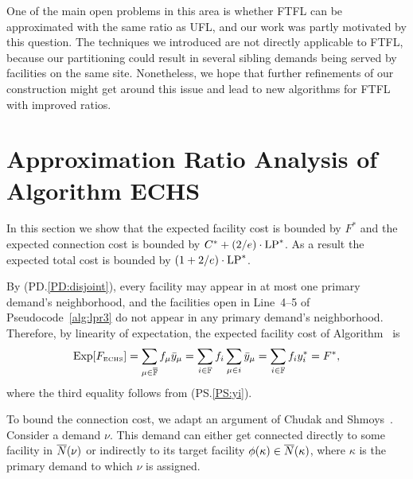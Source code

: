 \documentclass{llncs}
\begin{document}
One of the main open problems in this area is whether FTFL can be approximated with the
same ratio as UFL, and our work was partly motivated by this question. The techniques we
introduced are not directly applicable to FTFL, because our partitioning
could result in several sibling demands being served
by facilities on the same site. Nonetheless, we hope that further refinements of 
our construction might get around this issue and
lead to new algorithms for FTFL with improved ratios.

\vfill
\eject



\pagebreak


\appendix
\section{Approximation Ratio Analysis of Algorithm ECHS}
\label{app: 1.736 analysis}
In this section we show that the expected facility cost is bounded by
$F^\ast$ and the expected connection cost is bounded by $C^\ast +
(2/e) \cdot \mbox{\rm LP}^\ast$. As a result the expected total cost is bounded
by $(1 + 2/e)\cdot \mbox{\rm LP}^\ast$.

By (PD.\ref{PD:disjoint}), every facility may appear in at most one
primary demand's neighborhood, and the facilities open in Line~4--5 of
Pseudocode~\ref{alg:lpr3} do not appear in any primary demand's
neighborhood. Therefore, by linearity of expectation, the expected
facility cost of Algorithm~{\ECHS} is
%
\begin{equation*}
\mbox{\rm Exp}[F_{\mbox{\tiny\rm ECHS}}] 
	= \sum_{\mu\in\overline{\mathbb{F}}} f_\mu {\bar y}_{\mu} 
	= \sum_{i\in\mathbb{F}} f_i\sum_{\mu\in i} {\bar y}_{\mu} 
	= \sum_{i\in\mathbb{F}} f_i y_i^\ast = F^\ast,
\end{equation*}
%
where the third equality follows from (PS.\ref{PS:yi}).

\smallskip

To bound the connection cost, we adapt an argument of Chudak
and Shmoys~\cite{ChudakS04}. Consider a demand $\nu$. This
demand can either get connected directly to some facility in
${\overline{N}}(\nu)$ or indirectly to its target facility $\phi(\kappa)\in
{\overline{N}}(\kappa)$, where $\kappa$ is the primary demand to
which $\nu$ is assigned.
\end{document}
